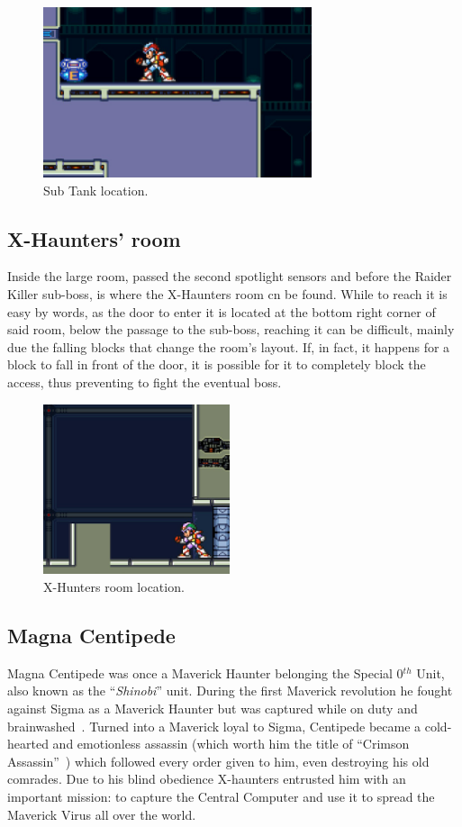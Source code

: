 \begin{figure}[htp]
	\centering
	\includegraphics[height=5cm]{figures/X2/Magna_centipede/Centipede_tank.png}
	\caption{Sub Tank location.}
\end{figure}

\subsection{X-Haunters' room}
Inside the large room, passed the second spotlight sensors and before the Raider Killer sub-boss, is where the X-Haunters room cn be found. While to reach it is easy by words, as the door to enter it is located at the bottom right corner of said room, below the passage to the sub-boss, reaching it can be difficult, mainly due the falling blocks that change the room's layout. If, in fact, it happens for a block to fall in front of the door, it is possible for it to completely block the access, thus preventing to fight the eventual boss. 

\begin{figure}[htp]
	\centering
	\includegraphics[height=5cm]{figures/X2/Magna_centipede/Centipede_haunter_room.png}
	\caption{X-Hunters room location.}
\end{figure}


\subsection{Magna Centipede}\label{boss:Magna_centipede}
Magna Centipede was once a Maverick Haunter belonging the Special 0$^{th}$ Unit, also known as the ``\textit{Shinobi}'' unit. During the first Maverick revolution he fought against Sigma as a Maverick Haunter but was captured while on duty and brainwashed~\cite{wayback:X2_resources}. Turned into a Maverick loyal to Sigma, Centipede became a cold-hearted and emotionless assassin (which worth him the title of ``Crimson Assassin''~\cite{book:MMX_Complete_art}) which followed every order given to him, even destroying his old comrades. Due to his blind obedience X-haunters entrusted him with an important mission: to capture the Central Computer and use it to spread the Maverick Virus all over the world.

